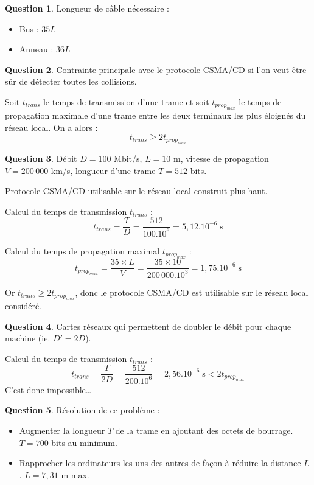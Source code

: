 \documentclass[11pt,english,french]{scrreprt}
\theoremstyle{remark}
\theoremstyle{definition}
\newtheorem{ques}{Question}[section]
\begin{document}
\begin{ques}
	Longueur de câble nécessaire :\begin{itemize}
		\item Bus : $35L$
		\item Anneau : $36L$
	\end{itemize}
\end{ques}

\begin{ques}
	Contrainte principale avec le protocole CSMA/CD si l'on veut être sûr de détecter toutes les collisions.
	
	Soit $t_{trans}$ le temps de transmission d'une trame et soit $t_{prop_{max}}$ le temps de propagation maximale d'une trame entre les deux terminaux les plus éloignés du réseau local. On a alors :\[t_{trans}\geqslant 2t_{prop_{max}}\]
\end{ques}

\begin{ques}
	Débit $D=100$ Mbit/s, $L=10$ m, vitesse de propagation $V=200\,000$ km/s, longueur d'une trame $T=512$ bits.
	
	Protocole CSMA/CD utilisable sur le réseau local construit plus haut.
	
	Calcul du temps de transmission $t_{trans}$ :\[t_{trans} = \frac{T}{D}=\frac{512}{100.10^6}=5,12.10^{-6}\;\textrm{s}\]
	
	Calcul du temps de propagation maximal $t_{prop_{max}}$ :\[t_{prop_{max}} = \frac{35\times L}{V}=\frac{35\times 10}{200\,000.10^3}=1,75.10^{-6}\;\textrm{s}\]
	
	Or $t_{trans}\geqslant 2t_{prop_{max}}$, donc le protocole CSMA/CD est utilisable sur le réseau local considéré.
\end{ques}

\begin{ques}
	Cartes réseaux qui permettent de doubler le débit pour chaque machine (ie. $D'=2D$).
	
	Calcul du temps de transmission $t_{trans}$ :\[t_{trans} = \frac{T}{2D}=\frac{512}{200.10^6}=2,56.10^{-6}\;\textrm{s} < 2 t_{prop_{max}}\]
	C'est donc impossible\dots
\end{ques}

\begin{ques}
	Résolution de ce problème : \begin{itemize}
		\item Augmenter la longueur $T$ de la trame en ajoutant des octets de bourrage. $T=700$ bits au minimum.
		\item Rapprocher les ordinateurs les uns des autres de façon à réduire la distance $L$. $L=7,31$ m max.
	\end{itemize}
\end{ques}
\end{document}
